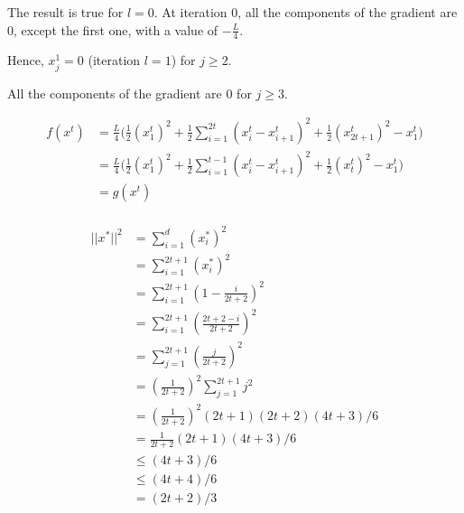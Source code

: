 \documentclass[
10pt, %
a4paper, %
oneside, %
headinclude,footinclude, %
BCOR5mm, %
]{scrartcl}
\begin{document}
\exercice{\textbf{}}

The result is true for $l=0$. At iteration $0$, all the components of the gradient are $0$, except the first one, with a value of $-\frac{L}{4}$.

Hence, $x^1_j=0$ (iteration $l=1$) for $j \geq 2$.

All the components of the gradient are $0$ for $j\geq 3$.

\exercice{\textbf{}}


\begin{align}
    f(x^t) &= \frac{L}{4} \Big( \frac{1}{2} (x_1^t)^2 + \frac{1}{2} \sum^{2t}_{i=1} (x_i^t-x_{i+1}^t)^2+ \frac{1}{2} (x_{2t+1}^t)^2-x_1^t \Big)\\
     &= \frac{L}{4} \Big( \frac{1}{2} (x_1^t)^2 + \frac{1}{2} \sum^{t-1}_{i=1} (x_i^t-x_{i+1}^t)^2+\frac{1}{2}(x_t^t)^2 -x_1^t \Big)\\
    &=g(x^t)\\ 
\end{align}

\exercice{\textbf{}}

\begin{align}
    \label{eq:}
    ||x^*||^2&=\sum_{i=1}^{d}(x_i^*)^2\\
    &=\sum_{i=1}^{2t+1}(x_i^*)^2\\
    &=\sum_{i=1}^{2t+1}(1- \frac{i}{2t+2} )^2\\
    &=\sum_{i=1}^{2t+1}(\frac{2t+2-i}{2t+2} )^2\\
    &=\sum_{j=1}^{2t+1}(\frac{j}{2t+2} )^2\\
    &=(\frac{1}{2t+2})^2\sum_{j=1}^{2t+1}j^2\\
    &=(\frac{1}{2t+2})^2(2t+1)(2t+2)(4t+3)/6\\
    &=\frac{1}{2t+2}(2t+1)(4t+3)/6\\
    &\leq(4t+3)/6\\
    &\leq(4t+4)/6\\
    &=(2t+2)/3\\
\end{align}
\end{document}
